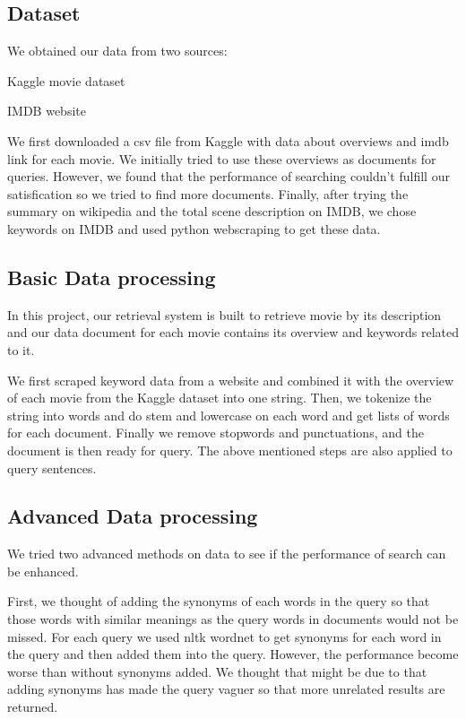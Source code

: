 \documentclass[sigconf,nonacm]{acmart}
\begin{document}
\subsection{Dataset}
We obtained our data from two sources:

Kaggle movie dataset\cite{kaggle1}

IMDB website\cite{imdb1}

We first downloaded a csv file from Kaggle with data about overviews and imdb link for each movie. We initially tried to use these overviews as documents for queries. However, we found that the performance of searching couldn't fulfill our satisfication so we tried to find more documents. Finally, after trying the summary on wikipedia and the total scene description on IMDB, we chose keywords on IMDB and used python webscraping to get these data.

\subsection{Basic Data processing}

In this project, our retrieval system is built to retrieve movie by its description and our data document for each movie contains its overview and keywords related to it.

We first scraped keyword data from a website and combined it with the overview of each movie from the Kaggle dataset into one string. Then, we tokenize the string into words and do stem and lowercase on each word and get lists of words for each document. Finally we remove stopwords and punctuations, and  the document is then ready for query. The above mentioned steps are also applied to query sentences.

\subsection{Advanced Data processing}

We tried two advanced methods on data to see if the performance of search can be enhanced.

First, we thought of adding the synonyms of each words in the query so that those words with similar meanings as the query words in documents would not be missed. For each query we used nltk wordnet to get synonyms for each word in the query and then added them into the query. However, the performance become worse than without synonyms added. We thought that might be due to that adding synonyms has made the query vaguer so that more unrelated results are returned.
\end{document}
